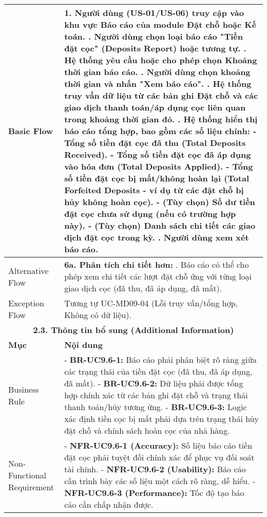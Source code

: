 \begin{longtable}{|m{4cm}|p{11cm}|}
Basic Flow & 1. Người dùng (US-01/US-06) truy cập vào khu vực Báo cáo của module Đặt chỗ hoặc Kế toán. \newline 2. Người dùng chọn loại báo cáo "Tiền đặt cọc" (Deposits Report) hoặc tương tự. \newline 3. Hệ thống yêu cầu hoặc cho phép chọn Khoảng thời gian báo cáo. \newline 4. Người dùng chọn khoảng thời gian và nhấn "Xem báo cáo". \newline 5. Hệ thống truy vấn dữ liệu từ các bản ghi Đặt chỗ và các giao dịch thanh toán/áp dụng cọc liên quan trong khoảng thời gian đó. \newline 6. Hệ thống hiển thị báo cáo tổng hợp, bao gồm các số liệu chính: \newline    - Tổng số tiền đặt cọc đã thu (Total Deposits Received). \newline    - Tổng số tiền đặt cọc đã áp dụng vào hóa đơn (Total Deposits Applied). \newline    - Tổng số tiền đặt cọc bị mất/không hoàn lại (Total Forfeited Deposits - ví dụ từ các đặt chỗ bị hủy không hoàn cọc). \newline    - (Tùy chọn) Số dư tiền đặt cọc chưa sử dụng (nếu có trường hợp này). \newline    - (Tùy chọn) Danh sách chi tiết các giao dịch đặt cọc trong kỳ. \newline 7. Người dùng xem xét báo cáo. \\
\hline
Alternative Flow & \textbf{6a. Phân tích chi tiết hơn:} \newline    1. Báo cáo có thể cho phép xem chi tiết các lượt đặt chỗ ứng với từng loại giao dịch cọc (đã thu, đã áp dụng, đã mất). \\
\hline
Exception Flow & Tương tự UC-MD09-04 (Lỗi truy vấn/tổng hợp, Không có dữ liệu). \\
\hline
\multicolumn{2}{|c|}{\textbf{2.3. Thông tin bổ sung (Additional Information)}} \\
\hline
\textbf{Mục} & \textbf{Nội dung} \\
\hline
Business Rule & - \textbf{BR-UC9.6-1:} Báo cáo phải phân biệt rõ ràng giữa các trạng thái của tiền đặt cọc (đã thu, đã áp dụng, đã mất). \newline - \textbf{BR-UC9.6-2:} Dữ liệu phải được tổng hợp chính xác từ các bản ghi đặt chỗ và trạng thái thanh toán/hủy tương ứng. \newline - \textbf{BR-UC9.6-3:} Logic xác định tiền cọc bị mất phải dựa trên trạng thái hủy đặt chỗ và chính sách hoàn cọc của nhà hàng. \\
\hline
Non-Functional Requirement & - \textbf{NFR-UC9.6-1 (Accuracy):} Số liệu báo cáo tiền đặt cọc phải tuyệt đối chính xác để phục vụ đối soát tài chính. \newline - \textbf{NFR-UC9.6-2 (Usability):} Báo cáo cần trình bày các số liệu một cách rõ ràng, dễ hiểu. \newline - \textbf{NFR-UC9.6-3 (Performance):} Tốc độ tạo báo cáo cần chấp nhận được. \\
\hline
\end{longtable}


